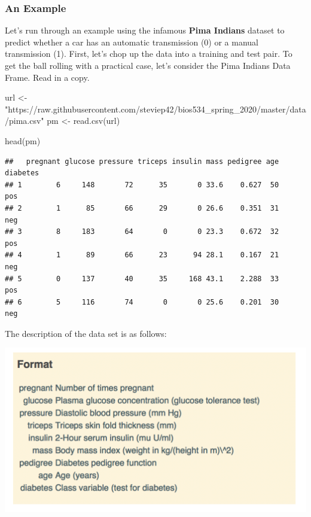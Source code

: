 \documentclass[
]{article}
\newenvironment{Shaded}{\begin{snugshade}}{\end{snugshade}}
\newcommand{\FunctionTok}[1]{\textcolor[rgb]{0.00,0.00,0.00}{#1}}
\newcommand{\NormalTok}[1]{#1}
\newcommand{\OtherTok}[1]{\textcolor[rgb]{0.56,0.35,0.01}{#1}}
\newcommand{\StringTok}[1]{\textcolor[rgb]{0.31,0.60,0.02}{#1}}
\begin{document}
\hypertarget{an-example}{%
\subsubsection{An Example}\label{an-example}}

Let's run through an example using the infamous \textbf{Pima Indians}
dataset to predict whether a car has an automatic transmission (0) or a
manual transmission (1). First, let's chop up the data into a training
and test pair. To get the ball rolling with a practical case, let's
consider the Pima Indians Data Frame. Read in a copy.

\begin{Shaded}
\begin{Highlighting}[]
\NormalTok{url }\OtherTok{\textless{}{-}} \StringTok{"https://raw.githubusercontent.com/steviep42/bios534\_spring\_2020/master/data/pima.csv"}
\NormalTok{pm }\OtherTok{\textless{}{-}} \FunctionTok{read.csv}\NormalTok{(url)}

\FunctionTok{head}\NormalTok{(pm)}
\end{Highlighting}
\end{Shaded}

\begin{verbatim}
##   pregnant glucose pressure triceps insulin mass pedigree age diabetes
## 1        6     148       72      35       0 33.6    0.627  50      pos
## 2        1      85       66      29       0 26.6    0.351  31      neg
## 3        8     183       64       0       0 23.3    0.672  32      pos
## 4        1      89       66      23      94 28.1    0.167  21      neg
## 5        0     137       40      35     168 43.1    2.288  33      pos
## 6        5     116       74       0       0 25.6    0.201  30      neg
\end{verbatim}

The description of the data set is as follows:

\includegraphics{./IMG/description.png}
\end{document}
